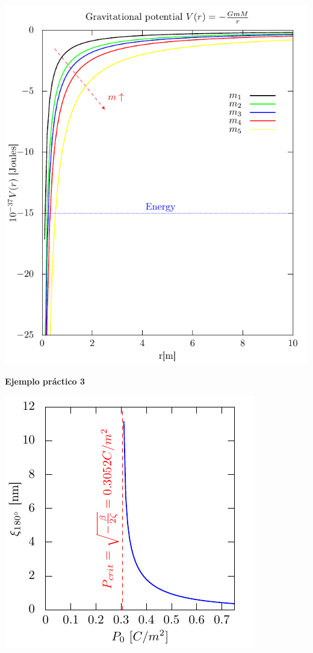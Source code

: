 \documentclass[11.5pt,a4paper]{article}
\begin{document}
\includegraphics[scale=0.75]{ejemplo6.pdf} 

\textbf{Ejemplo práctico 3}

\includegraphics[scale=0.80]{ejemplo7.pdf} 
\end{document}
